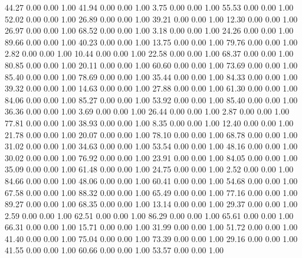    44.27   0.00   0.00   1.00
   41.94   0.00   0.00   1.00
    3.75   0.00   0.00   1.00
   55.53   0.00   0.00   1.00
   52.02   0.00   0.00   1.00
   26.89   0.00   0.00   1.00
   39.21   0.00   0.00   1.00
   12.30   0.00   0.00   1.00
   26.97   0.00   0.00   1.00
   68.52   0.00   0.00   1.00
    3.18   0.00   0.00   1.00
   24.26   0.00   0.00   1.00
   89.66   0.00   0.00   1.00
   40.23   0.00   0.00   1.00
   13.75   0.00   0.00   1.00
   79.76   0.00   0.00   1.00
    2.82   0.00   0.00   1.00
   10.44   0.00   0.00   1.00
   22.58   0.00   0.00   1.00
   68.37   0.00   0.00   1.00
   80.85   0.00   0.00   1.00
   20.11   0.00   0.00   1.00
   60.60   0.00   0.00   1.00
   73.69   0.00   0.00   1.00
   85.40   0.00   0.00   1.00
   78.69   0.00   0.00   1.00
   35.44   0.00   0.00   1.00
   84.33   0.00   0.00   1.00
   39.32   0.00   0.00   1.00
   14.63   0.00   0.00   1.00
   27.88   0.00   0.00   1.00
   61.30   0.00   0.00   1.00
   84.06   0.00   0.00   1.00
   85.27   0.00   0.00   1.00
   53.92   0.00   0.00   1.00
   85.40   0.00   0.00   1.00
   36.36   0.00   0.00   1.00
    3.69   0.00   0.00   1.00
   26.44   0.00   0.00   1.00
    2.87   0.00   0.00   1.00
   77.81   0.00   0.00   1.00
   38.93   0.00   0.00   1.00
    8.35   0.00   0.00   1.00
   12.40   0.00   0.00   1.00
   21.78   0.00   0.00   1.00
   20.07   0.00   0.00   1.00
   78.10   0.00   0.00   1.00
   68.78   0.00   0.00   1.00
   31.02   0.00   0.00   1.00
   34.63   0.00   0.00   1.00
   53.54   0.00   0.00   1.00
   48.16   0.00   0.00   1.00
   30.02   0.00   0.00   1.00
   76.92   0.00   0.00   1.00
   23.91   0.00   0.00   1.00
   84.05   0.00   0.00   1.00
   35.09   0.00   0.00   1.00
   61.48   0.00   0.00   1.00
   24.75   0.00   0.00   1.00
    2.52   0.00   0.00   1.00
   84.66   0.00   0.00   1.00
   48.06   0.00   0.00   1.00
   60.41   0.00   0.00   1.00
   54.68   0.00   0.00   1.00
   67.58   0.00   0.00   1.00
   88.32   0.00   0.00   1.00
   65.49   0.00   0.00   1.00
   77.16   0.00   0.00   1.00
   89.27   0.00   0.00   1.00
   68.35   0.00   0.00   1.00
   13.14   0.00   0.00   1.00
   29.37   0.00   0.00   1.00
    2.59   0.00   0.00   1.00
   62.51   0.00   0.00   1.00
   86.29   0.00   0.00   1.00
   65.61   0.00   0.00   1.00
   66.31   0.00   0.00   1.00
   15.71   0.00   0.00   1.00
   31.99   0.00   0.00   1.00
   51.72   0.00   0.00   1.00
   41.40   0.00   0.00   1.00
   75.04   0.00   0.00   1.00
   73.39   0.00   0.00   1.00
   29.16   0.00   0.00   1.00
   41.55   0.00   0.00   1.00
   60.66   0.00   0.00   1.00
   53.57   0.00   0.00   1.00
